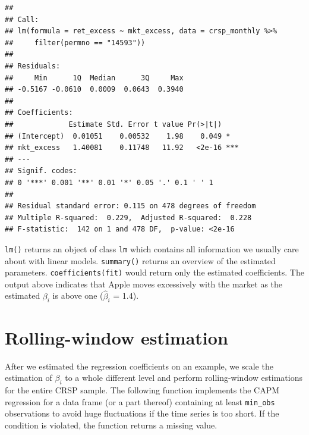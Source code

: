 \documentclass[
]{krantz}
\newenvironment{Shaded}{\begin{snugshade}}{\end{snugshade}}
\newcommand{\AttributeTok}[1]{\textcolor[rgb]{0.61,0.61,0.61}{#1}}
\newcommand{\ConstantTok}[1]{\textcolor[rgb]{0,0,0}{#1}}
\newcommand{\ControlFlowTok}[1]{\textcolor[rgb]{0.27,0.27,0.27}{\textbf{#1}}}
\newcommand{\DecValTok}[1]{\textcolor[rgb]{0.06,0.06,0.06}{#1}}
\newcommand{\FunctionTok}[1]{\textcolor[rgb]{0,0,0}{#1}}
\newcommand{\NormalTok}[1]{#1}
\newcommand{\OtherTok}[1]{\textcolor[rgb]{0.37,0.37,0.37}{#1}}
\newcommand{\SpecialCharTok}[1]{\textcolor[rgb]{0,0,0}{#1}}
\begin{document}
\begin{verbatim}
## 
## Call:
## lm(formula = ret_excess ~ mkt_excess, data = crsp_monthly %>% 
##     filter(permno == "14593"))
## 
## Residuals:
##     Min      1Q  Median      3Q     Max 
## -0.5167 -0.0610  0.0009  0.0643  0.3940 
## 
## Coefficients:
##             Estimate Std. Error t value Pr(>|t|)    
## (Intercept)  0.01051    0.00532    1.98    0.049 *  
## mkt_excess   1.40081    0.11748   11.92   <2e-16 ***
## ---
## Signif. codes:  
## 0 '***' 0.001 '**' 0.01 '*' 0.05 '.' 0.1 ' ' 1
## 
## Residual standard error: 0.115 on 478 degrees of freedom
## Multiple R-squared:  0.229,  Adjusted R-squared:  0.228 
## F-statistic:  142 on 1 and 478 DF,  p-value: <2e-16
\end{verbatim}

\texttt{lm()} returns an object of class \texttt{lm} which contains all information we usually care about with linear models. \texttt{summary()} returns an overview of the estimated parameters. \texttt{coefficients(fit)} would return only the estimated coefficients. The output above indicates that Apple moves excessively with the market as the estimated \(\beta_i\) is above one (\(\hat\beta_i\) = 1.4).

\hypertarget{rolling-window-estimation}{%
\section{Rolling-window estimation}\label{rolling-window-estimation}}

After we estimated the regression coefficients on an example, we scale the estimation of \(\beta_i\) to a whole different level and perform rolling-window estimations for the entire CRSP sample. The following function implements the CAPM regression for a data frame (or a part thereof) containing at least \texttt{min\_obs} observations to avoid huge fluctuations if the time series is too short. If the condition is violated, the function returns a missing value.

\begin{Shaded}
\end{Shaded}
\end{document}
